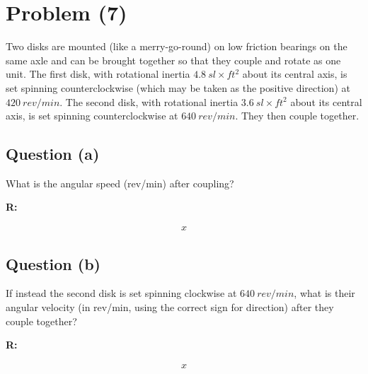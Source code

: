 \section{Problem (7)}
	Two disks are mounted (like a merry-go-round) on low friction bearings on the same axle and can be brought together so that they couple and rotate as one unit. The first disk, with rotational inertia $4.8 \ sl \times ft^{2}$ about its central axis, is set spinning counterclockwise (which may be taken as the positive direction) at $420 \ rev/min$. The second disk, with rotational inertia $3.6 \ sl \times ft^{2}$ about its central axis, is set spinning counterclockwise at $640 \ rev/min$. They then couple together.

	\subsection{Question (a)}

		What is the angular speed (rev/min) after coupling?

		\textbf{R:}

		\begin{align}
			x
		\end{align}

	\subsection{Question (b)}

		If instead the second disk is set spinning clockwise at $640 \ rev/min$, what is their angular velocity (in rev/min, using the correct sign for direction) after they couple together?

		\textbf{R:}

		\begin{align}
			x
		\end{align}
